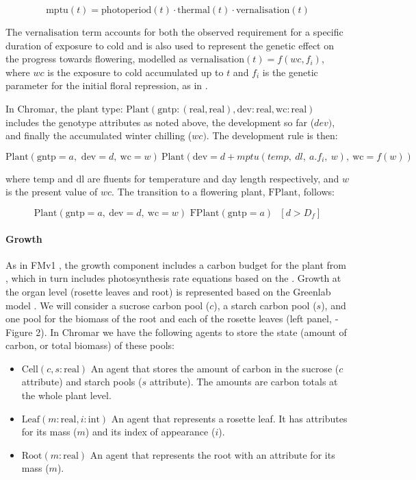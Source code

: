 \documentclass[phd]{infthesis}
\begin{document}
\[\text{mptu}(t) = \text{photoperiod}(t) \cdot \text{thermal}(t) \cdot \text{vernalisation}(t)\]

The \(\text{vernalisation}\) term accounts for both the observed requirement for
a specific duration of exposure to cold and is also used to represent the
genetic effect on the progress towards flowering, modelled as
\(\text{vernalisation}(t) = f(wc,f_{i})\), where $wc$ is the exposure to
cold accumulated up to \(t\) and \(f_{i}\) is the genetic parameter for the
initial floral repression, as in \citet{wilczek_effects_2009}.

In Chromar, the plant type:
\(\text{Plant}(\text{gntp}:(\text{real},\text{real}),\text{dev}:\text{real},\text{wc}:\text{real})\)
includes the genotype attributes as noted above, the development so far
(\(dev)\), and finally the accumulated winter chilling (\(wc)\). The
development rule is then:

\[{\text{Plant}\left( \text{gntp} = a,\text{\ dev} = d,\ \text{wc} = w \right)\ 
}{\text{Plant}(\text{dev} = d + mptu\left( temp,\ dl,\ a.f_{i},\ w \right),\ \text{wc} = f\left( w \right))}\]

where \(\text{temp}\) and \(\text{dl}\) are fluents for temperature and day
length respectively, and $w$ is the present value of $wc$. The transition to a
flowering plant, \(\text{FPlant}\), follows:

\[\text{Plant}\left( \text{gntp} = a,\ \text{dev} = d,\ \text{wc} = w
  \right)\text{\ FPlant}\left( \text{gntp} = a \right)\text{\ \ }\left\lbrack d
    > D_{f} \right\rbrack\]

\paragraph{Growth}
\label{growth}

As in FMv1 \citep{chew_multiscale_2014}, the growth component includes a carbon
budget for the plant from \citet{rasse_leaf_2006}, which in turn includes
photosynthesis rate equations based on the \citet{farquhar_biochemical_1980}
. Growth at the organ level (rosette leaves and root) is represented based on
the Greenlab model \citep{christophe_model-based_2008}. We will consider a
sucrose carbon pool (\(c\)), a starch carbon pool (\(s\)), and one pool for the
biomass of the root and each of the rosette leaves (left panel, ­­­Figure 2). In
Chromar we have the following agents to store the state (amount of carbon, or
total biomass) of these pools:

\begin{itemize}
\item
  \(\text{Cell}(c,s:\text{real})\) An agent that stores the amount of
  carbon in the sucrose (\(c\) attribute) and starch pools (\(s\)
  attribute). The amounts are carbon totals at the whole plant level.
\item
  \(\text{Leaf}(m:\text{real},i:\text{int})\) An agent that represents a
  rosette leaf. It has attributes for its mass (\(m\)) and its index of
  appearance (\(i\)).
\item
  \(\text{Root}(m:\text{real})\) An agent that represents the root with
  an attribute for its mass (\(m\)).
\end{itemize}
\end{document}
